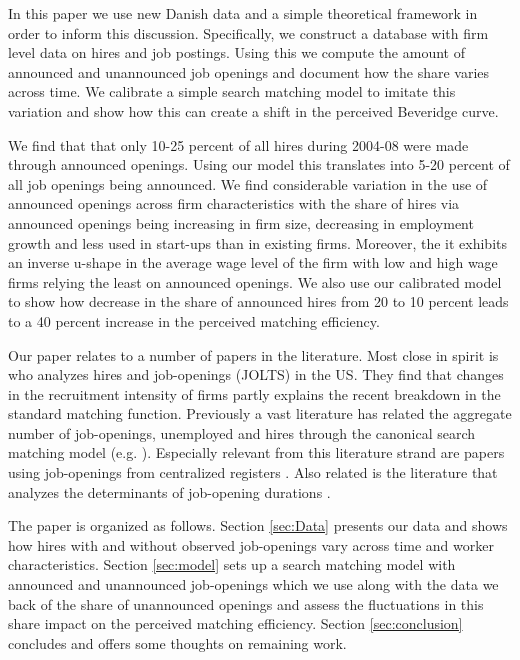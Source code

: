 \documentclass[11pt,article]{memoir}
\begin{document}
In this paper we use new Danish data and a simple theoretical framework in order to inform this discussion.
Specifically, we construct a database with firm level data on hires and job postings. Using this we compute the amount of announced and unannounced job openings and document how the share varies across time. We calibrate a simple search matching model to imitate this variation and show how this can create a shift in the perceived Beveridge curve.

We find that that only 10-25 percent of all hires during 2004-08 were made through announced openings. Using our model this translates into 5-20 percent of all job openings being announced. We find considerable variation in the use of announced openings across firm characteristics with the share of hires via announced openings being increasing in firm size, decreasing in employment growth and less used in start-ups than in existing firms. Moreover, the it exhibits an inverse u-shape in the average wage level of the firm with low and high wage firms relying the least on announced openings.  We also use our calibrated model to show how decrease in the share of announced hires from 20 to 10 percent leads to a 40 percent increase in the perceived matching efficiency.

Our paper relates to a number of papers in the literature. Most close in spirit is \cite{Davis2013} who analyzes hires and job-openings (JOLTS) in the US. They find that changes in the recruitment intensity of firms partly explains the recent breakdown in the standard matching function. Previously a vast literature has related the aggregate number of job-openings, unemployed and hires through the canonical search matching model (e.g. \cite{Blanchard1990}). Especially relevant from this literature strand are papers using job-openings from centralized registers \citep{Coles1996, Hansen2004, Yashiv2000, Sunde2007}. Also related is the literature that analyzes the determinants of job-opening durations \citep{Ours1991, Burdett1998, Barron1997, Holzer1990}.

The paper is organized as follows. Section \ref{sec:Data} presents our data and shows how hires with and without observed job-openings vary across time and worker characteristics. Section \ref{sec:model} sets up a search matching model with announced and unannounced job-openings which we use along with the data we back of the share of unannounced openings and assess the fluctuations in this share impact on the perceived matching efficiency. Section \ref{sec:conclusion} concludes and offers some thoughts on remaining work.
\end{document}
